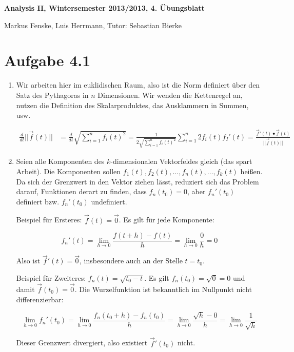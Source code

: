 \documentclass[a4paper,german,12pt,smallheadings]{scrartcl}
\begin{document}
\begin{center}
\bfseries %
\sffamily %
\vspace{-40pt}
Analysis II, Wintersemester 2013/2013, 4. Übungsblatt

Markus Fenske, Luis Herrmann, Tutor: Sebastian Bierke
\vspace{-10pt}
\end{center}

\section*{Aufgabe 4.1}
\begin{enumerate}[(1)]
  \item
    Wir arbeiten hier im euklidischen Raum, also ist die Norm definiert über den
    Satz des Pythagoras in $n$ Dimensionen. Wir wenden die Kettenregel an, nutzen
    die Definition des Skalarproduktes, das Ausklammern in Summen, usw.

    \begin{align*}
      \frac{d}{dt} ||\vec{f}(t)|| &= \frac{d}{dt} \sqrt{\sum_{i=1}^n f_i(t)^2}
       = \frac{1}{2 \sqrt{\sum_{i=1}^n f_i(t)^2}} \sum_{i=1}^n 2 f_i(t) f_I'(t)
       = \frac{\vec{f}'(t) \bullet \vec{f}(t)}{||\vec{f}(t)||}
    \end{align*}
  \item
    Seien alle Komponenten des $k$-dimensionalen Vektorfeldes gleich (das spart Arbeit). Die
    Komponenten sollen $f_1(t), f_2(t), \dots, f_n(t), \dots, f_k(t)$ heißen. Da sich der
    Grenzwert in den Vektor ziehen lässt, reduziert sich das Problem darauf,
    Funktionen derart zu finden, dass $f_n(t_0) = 0$, aber $f_n'(t_0)$
    definiert bzw.  $f_n'(t_0)$ undefiniert.

    Beispiel für Ersteres: $\vec{f}(t) = \vec{0}$. Es gilt für jede Komponente:

    \begin{equation*}
      f_n'(t) = \lim_{h \to 0} \frac{f(t + h) - f(t)}{h} = \lim_{h \to 0} \frac{0}{h} = 0
    \end{equation*}

    Also ist $\vec{f}'(t) = \vec{0}$, insbesondere auch an der Stelle $t = t_0$.

    Beispiel für Zweiteres: $f_n(t) = \sqrt{t_0-t}$. Es gilt $f_n(t_0) =
    \sqrt{0} = 0$ und damit $\vec{f}(t_0) = \vec{0}$. Die Wurzelfunktion ist
    bekanntlich im Nullpunkt nicht differenzierbar:

    \begin{equation*}
      \lim_{h \to 0} f_n'(t_0) = \lim_{h \to 0} \frac{f_n(t_0 + h) - f_n(t_0)}{h} = 
      \lim_{h \to 0} \frac{\sqrt{h} - 0}{h} = \lim_{h \to 0} \frac{1}{\sqrt{h}}
    \end{equation*}

    Dieser Grenzwert divergiert, also existiert $\vec{f}'(t_0)$ nicht.
\end{enumerate}
\end{document}
